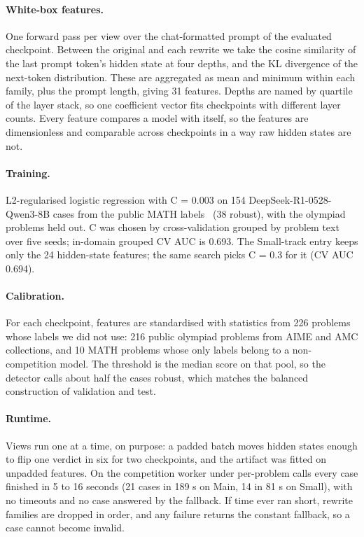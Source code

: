\documentclass{article}
\begin{document}
\paragraph{White-box features.} One forward pass per view over the chat-formatted prompt of the evaluated checkpoint. Between the original and each rewrite we take the cosine similarity of the last prompt token's hidden state at four depths, and the KL divergence of the next-token distribution. These are aggregated as mean and minimum within each family, plus the prompt length, giving 31 features. Depths are named by quartile of the layer stack, so one coefficient vector fits checkpoints with different layer counts. Every feature compares a model with itself, so the features are dimensionless and comparable across checkpoints in a way raw hidden states are not.

\paragraph{Training.} L2-regularised logistic regression with C = 0.003 on 154 DeepSeek-R1-0528-Qwen3-8B cases from the public MATH labels~\citep{hendrycks2021math} (38 robust), with the olympiad problems held out. C was chosen by cross-validation grouped by problem text over five seeds; in-domain grouped CV AUC is 0.693. The Small-track entry keeps only the 24 hidden-state features; the same search picks C = 0.3 for it (CV AUC 0.694).

\paragraph{Calibration.} For each checkpoint, features are standardised with statistics from 226 problems whose labels we did not use: 216 public olympiad problems from AIME and AMC collections, and 10 MATH problems whose only labels belong to a non-competition model. The threshold is the median score on that pool, so the detector calls about half the cases robust, which matches the balanced construction of validation and test.

\paragraph{Runtime.} Views run one at a time, on purpose: a padded batch moves hidden states enough to flip one verdict in six for two checkpoints, and the artifact was fitted on unpadded features. On the competition worker under per-problem calls every case finished in 5 to 16 seconds (21 cases in 189 s on Main, 14 in 81 s on Small), with no timeouts and no case answered by the fallback. If time ever ran short, rewrite families are dropped in order, and any failure returns the constant fallback, so a case cannot become invalid.
\end{document}

